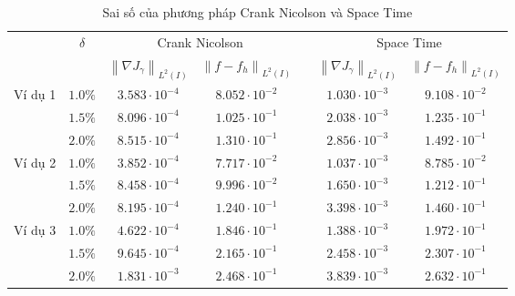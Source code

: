 \documentclass[]{article}
\begin{document}
\begin{table}[ht]
	\centering
	\begin{tabular}{ccccccc}
		\toprule
		\multirow{2}{*}{}&\multirow{2}{*}{$\delta$} & \multicolumn{2}{c}{Crank Nicolson} && \multicolumn{2}{c}{Space Time}\\
		\cmidrule{3-4} \cmidrule{6-7}&&
		$\left\|\nabla J_{\gamma}\right\|_{L^2(I)}$& $\left\|f-f_h\right\|_{L^2(I)}$ 
		&&
		$\left\|\nabla J_{\gamma}\right\|_{L^2(I)}$& $\left\|f-f_h\right\|_{L^2(I)}$ \\
		\midrule
		\multirow{3}{*}{Ví dụ 1} 
		&$1.0\%$&$3.583\cdot10^{-4}$&$8.052\cdot10^{-2}$&&$1.030\cdot10^{-3}$&$9.108\cdot10^{-2}$\\
		&$1.5\%$&$8.096\cdot10^{-4}$&$1.025\cdot10^{-1}$&&$2.038\cdot10^{-3}$&$1.235\cdot10^{-1}$\\
		&$2.0\%$&$8.515\cdot10^{-4}$&$1.310\cdot10^{-1}$&&$2.856\cdot10^{-3}$&$1.492\cdot10^{-1}$\\
		\midrule
		\multirow{3}{*}{Ví dụ 2} 
		&$1.0\%$&$3.852\cdot10^{-4}$&$7.717\cdot10^{-2}$&&$1.037\cdot10^{-3}$&$8.785\cdot10^{-2}$\\
		&$1.5\%$&$8.458\cdot10^{-4}$&$9.996\cdot10^{-2}$&&$1.650\cdot10^{-3}$&$1.212\cdot10^{-1}$\\
		&$2.0\%$&$8.195\cdot10^{-4}$&$1.240\cdot10^{-1}$&&$3.398\cdot10^{-3}$&$1.460\cdot10^{-1}$\\
		\midrule
		\multirow{3}{*}{Ví dụ 3} 
		&$1.0\%$&$4.622\cdot10^{-4}$&$1.846\cdot10^{-1}$&&$1.388\cdot10^{-3}$&$1.972\cdot10^{-1}$\\
		&$1.5\%$&$9.645\cdot10^{-4}$&$2.165\cdot10^{-1}$&&$2.458\cdot10^{-3}$&$2.307\cdot10^{-1}$\\
		&$2.0\%$&$1.831\cdot10^{-3}$&$2.468\cdot10^{-1}$&&$3.839\cdot10^{-3}$&$2.632\cdot10^{-1}$\\
		\bottomrule
	\end{tabular}
	\caption{Sai số của phương pháp Crank Nicolson và Space Time}
\end{table}
\end{document}
